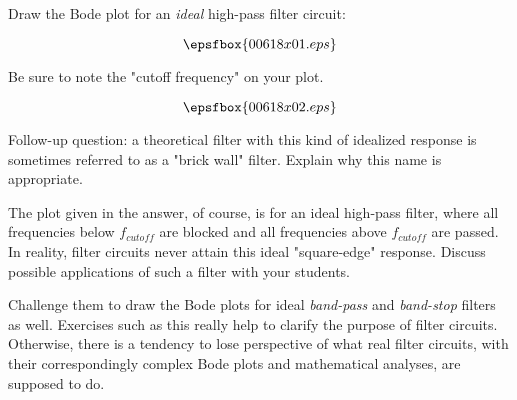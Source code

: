

Draw the Bode plot for an {\it ideal} high-pass filter circuit:

$$\epsfbox{00618x01.eps}$$

Be sure to note the "cutoff frequency" on your plot.







$$\epsfbox{00618x02.eps}$$

\vskip 10pt

Follow-up question: a theoretical filter with this kind of idealized response is sometimes referred to as a "brick wall" filter.  Explain why this name is appropriate.







The plot given in the answer, of course, is for an ideal high-pass filter, where all frequencies below $f_{cutoff}$ are blocked and all frequencies above $f_{cutoff}$ are passed.  In reality, filter circuits never attain this ideal "square-edge" response.  Discuss possible applications of such a filter with your students.  

Challenge them to draw the Bode plots for ideal {\it band-pass} and {\it band-stop} filters as well.  Exercises such as this really help to clarify the purpose of filter circuits.  Otherwise, there is a tendency to lose perspective of what real filter circuits, with their correspondingly complex Bode plots and mathematical analyses, are supposed to do.




